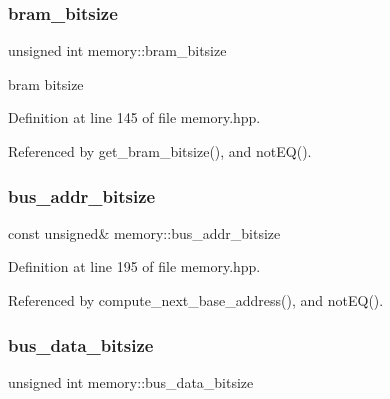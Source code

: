 \mbox{\label{classmemory_a8ce0f5cb063649425c36d630446cbdab}} 
\subsubsection{\texorpdfstring{bram\+\_\+bitsize}{bram\_bitsize}}
{\footnotesize\ttfamily unsigned int memory\+::bram\+\_\+bitsize\hspace{0.3cm}{\ttfamily [private]}}



bram bitsize 



Definition at line 145 of file memory.\+hpp.



Referenced by get\+\_\+bram\+\_\+bitsize(), and not\+E\+Q().

\mbox{\label{classmemory_acb8126266d6dbffc611a67b26feb8d97}} 
\subsubsection{\texorpdfstring{bus\+\_\+addr\+\_\+bitsize}{bus\_addr\_bitsize}}
{\footnotesize\ttfamily const unsigned\& memory\+::bus\+\_\+addr\+\_\+bitsize\hspace{0.3cm}{\ttfamily [private]}}



Definition at line 195 of file memory.\+hpp.



Referenced by compute\+\_\+next\+\_\+base\+\_\+address(), and not\+E\+Q().

\mbox{\label{classmemory_a0bbe4c23f492172e842d5de6334f48b7}} 
\subsubsection{\texorpdfstring{bus\+\_\+data\+\_\+bitsize}{bus\_data\_bitsize}}
{\footnotesize\ttfamily unsigned int memory\+::bus\+\_\+data\+\_\+bitsize\hspace{0.3cm}{\ttfamily [private]}}



